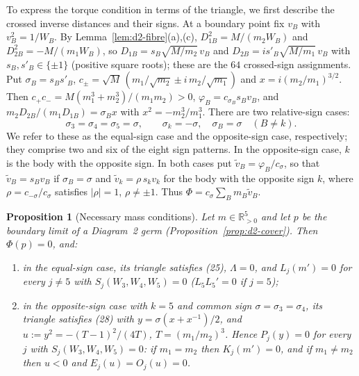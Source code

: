 \documentclass[Threeside,11pt]{article}
\newtheorem{proposition}[theorem]{Proposition}
\theoremstyle{definition}
\theoremstyle{remark}
\numberwithin{equation}{section}
\theoremstyle{remark}
\newcommand{\Rp}{\mathbb{R}_{>0}}
\newenvironment{alphalist}{\begin{enumerate}\renewcommand{\labelenumi}{(\alph{enumi})}%
  \renewcommand{\theenumi}{\alph{enumi}}}{\end{enumerate}}
\begin{document}
{To express the torque condition in terms of the triangle, we first describe
the crossed inverse distances and their signs.}  At a boundary point fix $v_B$ with $v_B^2=1/W_B$.  By Lemma~\ref{lem:d2-fibre}(a),(c),
$D_{1B}^2=M/(m_2W_B)$ and $D_{2B}^2=-M/(m_1W_B)$, so $D_{1B}=s_B\sqrt{M/m_2}\,v_B$ and
$D_{2B}=is'_B\sqrt{M/m_1}\,v_B$ with $s_B,s'_B\in\{\pm1\}$ (positive square roots); these are the
$64$ crossed-sign assignments.  Put $\sigma_B=s_Bs'_B$,
$c_\pm=\sqrt M\,(m_1/\sqrt{m_2}\pm i\,m_2/\sqrt{m_1})$ and $x=i(m_2/m_1)^{3/2}$.  Then
$c_+c_-=M(m_1^3+m_2^3)/(m_1m_2)>0$, $\varphi_B=c_{\sigma_B}s_Bv_B$, and
$m_2D_{2B}/(m_1D_{1B})=\sigma_Bx$ with $x^2=-m_2^3/m_1^3$.  There are two relative-sign cases:
\[
 \sigma_3=\sigma_4=\sigma_5=\sigma,\qquad
 \sigma_k=-\sigma,\quad \sigma_B=\sigma\quad(B\ne k).
\]
We refer to these as the equal-sign case and the opposite-sign case, respectively;
they comprise two and six of the eight sign patterns. In the opposite-sign case,
$k$ is the body with the opposite sign.  In both cases put $\tilde v_B=\varphi_B/c_\sigma$, so that $\tilde v_B=s_Bv_B$ if
$\sigma_B=\sigma$ and $\tilde v_k=\rho\,s_kv_k$ for the body with the opposite sign $k$, where
$\rho=c_{-\sigma}/c_\sigma$ satisfies $|\rho|=1$, $\rho\ne\pm1$.  Thus
$\Phi=c_\sigma\sum_Bm_B\tilde v_B$.
\begin{proposition}[Necessary mass conditions]\label{prop:d2-first}
Let $m\in\Rp^5$ and let $p$ be the boundary limit of a Diagram~2 germ
\textup{(}Proposition~\ref{prop:d2-cover}\textup{)}.  Then $\Phi(p)=0$, and:
\begin{alphalist}
  \item in the equal-sign case, its triangle satisfies \textup{(25)}, $\Lambda=0$, and
  $L_j(m')=0$ for every $j\ne5$ with $S_j(W_3,W_4,W_5)=0$ \textup{(}$L_5L_5'=0$ if $j=5$\textup{)};
  \item in the opposite-sign case with $k=5$ and common sign $\sigma=\sigma_3=\sigma_4$, its triangle satisfies
  \textup{(28)} with $y=\sigma(x+x^{-1})/2$, and $u:=y^2=-(T-1)^2/(4T)$, $T=(m_1/m_2)^3$.  Hence
  $P_j(y)=0$ for every $j$ with $S_j(W_3,W_4,W_5)=0$: if $m_1=m_2$ then $K_j(m')=0$, and if
  $m_1\ne m_2$ then $u<0$ and $E_j(u)=O_j(u)=0$.
\end{alphalist}
\end{proposition}
\end{document}
